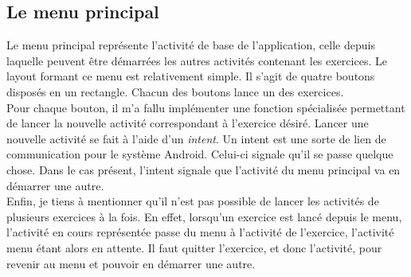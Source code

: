 \subsection{Le menu principal}
Le menu principal représente l'activité de base de l'application, celle depuis laquelle peuvent être démarrées les autres activités contenant les exercices. Le layout formant ce menu est relativement simple. Il s'agit de quatre boutons disposés en un rectangle. Chacun des boutons lance un des exercices.\\

Pour chaque bouton, il m'a fallu implémenter une fonction spécialisée permettant de lancer la nouvelle activité correspondant à l'exercice désiré.
Lancer une nouvelle activité se fait à l'aide d'un \textit{intent}. Un intent est une sorte de lien de communication pour le système Android. Celui-ci signale qu'il se passe quelque chose. Dans le cas présent, l'intent signale que l'activité du menu principal va en démarrer une autre.\\

Enfin, je tiens à mentionner qu'il n'est pas possible de lancer les activités de plusieurs exercices à la fois. En effet, lorsqu'un exercice est lancé depuis le menu, l'activité en cours représentée passe du menu à l'activité de l'exercice, l'activité menu étant alors en attente. Il faut quitter l'exercice, et donc l'activité, pour revenir au menu et pouvoir en démarrer une autre.



